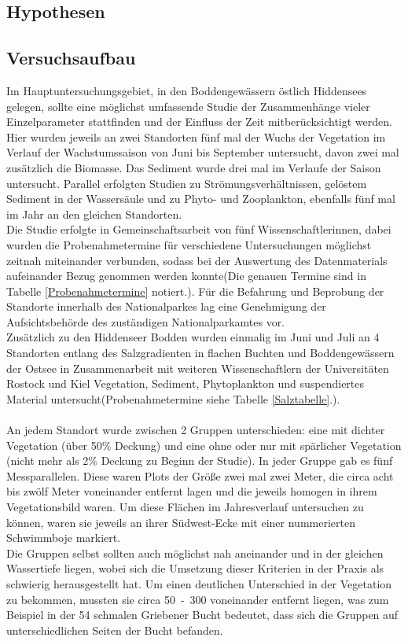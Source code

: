 \subsection{Hypothesen}




\subsection{Versuchsaufbau}

Im Hauptuntersuchungsgebiet, in den Boddengewässern östlich Hiddensees gelegen, sollte eine möglichst umfassende Studie der Zusammenhänge vieler Einzelparameter stattfinden und der Einfluss der Zeit mitberücksichtigt werden. Hier wurden jeweils an zwei Standorten fünf mal der Wuchs der Vegetation im Verlauf der Wachstumssaison von Juni bis September untersucht, davon zwei mal zusätzlich die Biomasse. Das Sediment wurde drei mal im Verlaufe der Saison untersucht. Parallel erfolgten Studien zu Strömungsverhältnissen, gelöstem Sediment in der Wassersäule und zu Phyto- und Zooplankton, ebenfalls fünf mal im Jahr an den gleichen Standorten. \\
Die Studie erfolgte in Gemeinschaftsarbeit von fünf Wissenschaftlerinnen, dabei wurden die Probenahmetermine für verschiedene Untersuchungen möglichst zeitnah miteinander verbunden, sodass bei der Auswertung des Datenmaterials aufeinander Bezug genommen werden konnte(Die genauen Termine sind in Tabelle \ref{Probenahmetermine} notiert.). Für die Befahrung und Beprobung der Standorte innerhalb des Nationalparkes lag eine Genehmigung der Aufsichtsbehörde des zuständigen Nationalparkamtes vor. \\
Zusätzlich zu den Hiddenseer Bodden wurden einmalig im Juni und Juli an 4 Standorten entlang des Salzgradienten in flachen Buchten und Boddengewässern der Ostsee  in Zusammenarbeit mit weiteren Wissenschaftlern der Universitäten Rostock und Kiel Vegetation, Sediment, Phytoplankton und suspendiertes Material untersucht(Probenahmetermine siehe Tabelle \ref{Salztabelle}.). \\
\\
An jedem Standort wurde zwischen 2 Gruppen unterschieden: eine mit dichter Vegetation (über 50\% Deckung) und eine ohne oder nur mit spärlicher Vegetation (nicht mehr als 2\% Deckung zu Beginn der Studie). In jeder Gruppe gab es fünf Messparallelen. Diese waren Plots der Größe zwei mal zwei Meter, die circa acht bis zwölf Meter voneinander entfernt lagen und die jeweils homogen in ihrem Vegetationsbild waren. Um diese Flächen im Jahresverlauf untersuchen zu können, waren sie jeweils an ihrer Südwest-Ecke mit einer nummerierten Schwimmboje markiert.\\ 
Die Gruppen selbst sollten auch möglichst nah aneinander und in der gleichen Wassertiefe liegen, wobei sich die Umsetzung dieser Kriterien in der Praxis als schwierig herausgestellt hat. Um einen deutlichen Unterschied in der Vegetation zu bekommen, mussten sie circa \unit{50-300}{\metre} voneinander entfernt liegen, was zum Beispiel in der \unit{54}{\metre} schmalen Griebener Bucht bedeutet, dass sich die Gruppen auf unterschiedlichen Seiten der Bucht befanden. 





